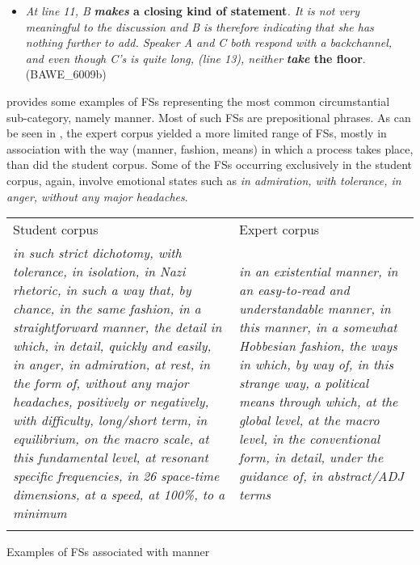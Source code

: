 \documentclass[output=paper]{langsci/langscibook}
\begin{document}
\begin{itemize}
\item \begin{styleListParagraph}
\textit{At line 11, B} \textbf{\textit{makes} \textbf{a} \textbf{closing} \textbf{kind} \textbf{of} \textbf{statement}}\textit{. It is not very meaningful to the discussion and B is therefore indicating that she has nothing further to add. Speaker A and C both respond with a backchannel, and even though C’s is quite long, (line 13), neither} \textbf{\textit{take} \textbf{the} \textbf{floor}}. (BAWE\_6009b)
\end{styleListParagraph}
\end{itemize}

 provides some examples of FSs representing the most common circumstantial sub-category, namely manner. Most of such FSs are prepositional phrases. As can be seen in , the expert corpus yielded a more limited range of FSs, mostly in association with the way (manner, fashion, means) in which a process takes place, than did the student corpus. Some of the FSs occurring exclusively in the student corpus, again, involve emotional states such as \textit{in admiration, with tolerance, in anger, without any major headaches}. 


\begin{tabularx}{\textwidth}{XX}

\lsptoprule

Student corpus & Expert corpus\\
\textit{in such strict dichotomy, with tolerance, in isolation, in Nazi rhetoric, in such a way that, by chance, in the same fashion, in a straightforward manner, the detail in which, in detail, quickly and easily, in anger, in admiration, at rest, in the form of, without any major headaches, positively or negatively, with difficulty, long/short term, in equilibrium, on the macro scale, at this fundamental level, at resonant specific frequencies, in 26 space-time dimensions, at a speed, at 100\%, to a minimum} & \textit{in an existential manner, in an easy-to-read and understandable manner, in this manner, in a somewhat Hobbesian fashion, the ways in which, by way of, in this strange way, a political means through which, at the global level,  at the macro level, in the conventional form, in detail, under the guidance of, in abstract/ADJ terms}\\
\lspbottomrule
\end{tabularx}
\begin{table}
\caption{Examples of FSs associated with manner}
\label{tab:key:8}
\end{table}
\end{document}
